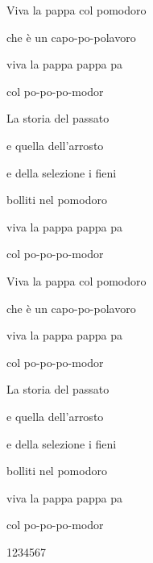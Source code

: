\documentclass{article}
\begin{document}
Viva la pappa col pomodoro

che \`e un capo-po-polavoro

viva la pappa pappa pa

col po-po-po-modor

La storia del passato

e quella dell'arrosto

e della selezione i fieni

bolliti nel pomodoro

viva la pappa pappa pa

col po-po-po-modor

Viva la pappa col pomodoro

che \`e un capo-po-polavoro

viva la pappa pappa pa

col po-po-po-modor

La storia del passato

e quella dell'arrosto

e della selezione i fieni

bolliti nel pomodoro

viva la pappa pappa pa

col po-po-po-modor

1234567
\end{document}
